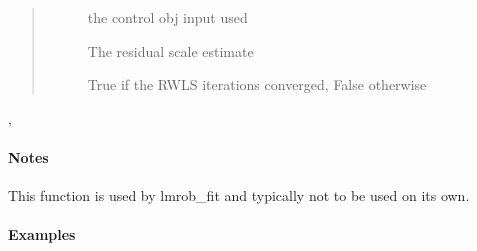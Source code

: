 \documentclass[letterpaper,10pt,english]{sphinxmanual}
\begin{document}
\begin{fulllineitems}
\begin{quote}
\begin{description}
\begin{description}
\item[{}] \leavevmode
the control obj input used

\item[{}] \leavevmode
The residual scale estimate

\item[{}] \leavevmode
True if the RWLS iterations converged, False otherwise

\end{description}

\end{description}\end{quote}




{\hyperref[\detokenize{_modules/lmrob:lmrob.lmrob_fit}]{}}, {\hyperref[\detokenize{_modules/lmrob:module-lmrob}]{}}


\paragraph{Notes}

This function is used by lmrob\_fit and typically
not to be used on its own.
\paragraph{Examples}


\end{fulllineitems}
\end{document}
